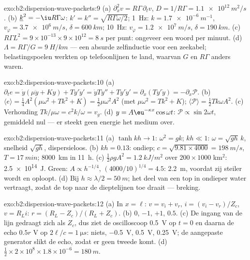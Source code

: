 \begin{solution}{exo:b2:dispersion-wave-packets:9}
(a) $\partial_x^2v = R\Gamma\,\partial_tv$,
$D = 1/R\Gamma = \qty{1.1e12}{m^2/s}$. (b)
$\underline k^2
= -\iu R\Gamma\omega$: $k' = k'' = \sqrt{R\Gamma\omega/2}$;
\qty{1}{Hz}: $k = \qty{1.7e-6}{m^{-1}}$, $v_\varphi = \qty{3.7e6}{m/s}$,
$\delta = \qty{600}{km}$; \qty{10}{Hz}: $v_\varphi = \qty{1.2e7}{m/s}$,
$\delta = \qty{190}{km}$. (c)
$R\Gamma L^2 = 9 \times 10^{-13} \times 9 \times 10^{12} = \qty{8}{s}$ per
punt: ongeveer een woord per minuut. (d)
$\Lambda = R\Gamma/G = \qty{9}{H/km}$ --- een absurde zelfinductie voor een
zeekabel; belastingspoelen werkten op telefoonlijnen te land, waarvan $G$ en
$R\Gamma$ anders waren.
\end{solution}

\begin{solution}{exo:b2:dispersion-wave-packets:10}
(a)
$\partial_te = \dot y(\mu\ddot y + Ky) + Ty'\dot y' = \dot yTy'' + Ty'\dot y' = \partial_x
(Ty'\dot y) = -\partial_x\mathcal P$.
(b)
$\langle e\rangle = \tfrac14A^2(\mu\omega^2 + Tk^2 + K) =
\tfrac12\mu\omega^2A^2$
(met $\mu\omega^2 = Tk^2 + K$);
$\langle\mathcal P\rangle = \tfrac12Tk\omega
A^2$. (c) Verhouding
$Tk/\mu\omega = c^2k/\omega = v_g$. (d) $y = A\eu^{-\kappa x}\cos\omega t$:
$\mathcal P \propto \sin2\omega t$, gemiddeld nul --- er steekt geen energie
het medium over.
\end{solution}

\begin{solution}{exo:b2:dispersion-wave-packets:11}
(a) $\tanh kh \to 1$: $\omega^2 = gk$; $kh \ll 1$: $\omega = \sqrt{gh}\,k$,
snelheid $\sqrt{gh}$, dispersieloos. (b) $kh = 0.13$: ondiep;
$c = \sqrt{9.81 \times 4000} = \qty{198}{m/s}$, $T = \qty{17}{min}$;
\qty{8000}{km} in \qty{11}{h}. (c) $\tfrac12\rho gA^2 = \qty{1.2}{kJ/m^2}$
over $200 \times 1000$ km$^2$: \qty{2.5e14}{J}. Green: $A \propto h^{-1/4}$,
$(4000/10)^{1/4}
= 4.5$: \qty{2.2}{m}, voordat zij steiler wordt en oploopt.
(d) Bij $h \approx \lambda/2 =
\qty{50}{m}$; het deel van een top in
ondieper water vertraagt, zodat de top naar de dieptelijnen toe draait ---
breking.
\end{solution}

\begin{solution}{exo:b2:dispersion-wave-packets:12}
(a) In $x = \ell$: $v = v_i + v_r$, $i = (v_i - v_r)/Z_c$, $v = R_Li$:
$r = (R_L -
Z_c)/(R_L + Z_c)$. (b) $0$, $-1$, $+1$, $0.5$. (c) De ingang van
de lijn gedraagt zich als $Z_c$, dus ziet de oscilloscoop \qty{0.5}{V} op
$t = 0$ en daarna de echo $0.5r$ V op $2\ell/c = \qty{1}{\micro s}$: niets,
\qty{-0.5}{V}, \qty{+0.5}{V}, \qty{+0.25}{V}; de aangepaste generator slikt
de echo, zodat er geen tweede komt. (d)
$\tfrac12 \times 2 \times 10^8 \times 1.8 \times 10^{-6} = \qty{180}{m}$.
\end{solution}


